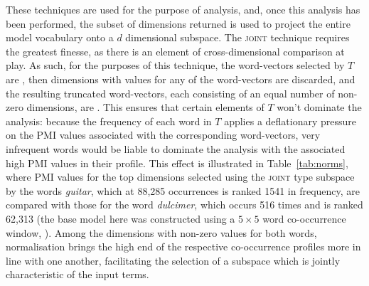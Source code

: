 
These techniques are used for the purpose of analysis, and, once this analysis has been performed, the subset of dimensions returned is used to project the entire model vocabulary onto a $d$ dimensional subspace.  The \textsc{joint} technique requires the greatest finesse, as there is an element of cross-dimensional comparison at play.  As such, for the purposes of this technique, the word-vectors selected by $T$ are , then dimensions with values for any of the word-vectors are discarded, and the resulting truncated word-vectors, each consisting of an equal number of non-zero dimensions, are  .  This ensures that certain elements of $T$ won't dominate the analysis: because the frequency of each word in $T$ applies a deflationary pressure on the PMI values associated with the corresponding word-vectors, very infrequent words would be liable to dominate the analysis with the associated high PMI values in their profile.  This effect is illustrated in Table~\ref{tab:norms}, where PMI values for the top dimensions selected using the \textsc{joint} type subspace by the words \emph{guitar}, which at 88,285 occurrences is ranked 1541 in frequency, are compared with those for the word \emph{dulcimer}, which occurs 516 times and is ranked 62,313 (the base model here was constructed using a $5 \times 5$ word co-occurrence window, ).  Among the dimensions with non-zero values for both words, normalisation brings the high end of the respective co-occurrence profiles more in line with one another, facilitating the selection of a subspace which is jointly characteristic of the input terms.

